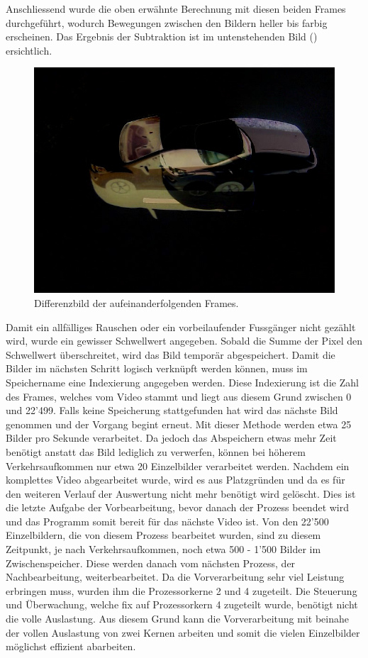 Anschliessend wurde die oben erwähnte Berechnung mit diesen beiden Frames durchgeführt, wodurch Bewegungen zwischen den Bildern heller bis farbig erscheinen. Das Ergebnis der Subtraktion ist im untenstehenden Bild () ersichtlich.

\begin{figure}[H]
  \centering
  \includegraphics[height=0.3\textheight]{Software/Blur1.jpg} 
  \caption{Differenzbild der aufeinanderfolgenden Frames.}
  \label{bBlur1}
\end{figure} 

Damit ein allfälliges Rauschen oder ein vorbeilaufender Fussgänger nicht gezählt wird, wurde ein gewisser Schwellwert angegeben. Sobald die Summe der Pixel den Schwellwert überschreitet, wird das Bild temporär abgespeichert. Damit die Bilder im nächsten Schritt logisch verknüpft werden können, muss im Speichername eine Indexierung angegeben werden. Diese Indexierung ist die Zahl des Frames, welches vom Video stammt und liegt aus diesem Grund zwischen 0 und 22'499. Falls keine Speicherung stattgefunden hat wird das nächste Bild genommen und der Vorgang begint erneut. Mit dieser Methode werden etwa 25 Bilder pro Sekunde verarbeitet. Da jedoch das Abspeichern etwas mehr Zeit benötigt anstatt das Bild lediglich zu verwerfen, können bei höherem Verkehrsaufkommen nur etwa 20 Einzelbilder verarbeitet werden. Nachdem ein komplettes Video abgearbeitet wurde, wird es aus Platzgründen und da es für den weiteren Verlauf der Auswertung nicht mehr benötigt wird gelöscht. Dies ist die letzte Aufgabe der Vorbearbeitung, bevor danach der Prozess beendet wird und das Programm somit bereit für das nächste Video ist. Von den 22'500 Einzelbildern, die von diesem Prozess bearbeitet wurden, sind zu diesem Zeitpunkt, je nach Verkehrsaufkommen, noch etwa 500 - 1'500 Bilder im Zwischenspeicher. Diese werden danach vom nächsten Prozess, der Nachbearbeitung, weiterbearbeitet. Da die Vorverarbeitung sehr viel Leistung erbringen muss, wurden ihm die Prozessorkerne 2 und 4 zugeteilt. Die Steuerung und Überwachung, welche fix auf Prozessorkern 4 zugeteilt wurde, benötigt nicht die volle Auslastung. Aus diesem Grund kann die Vorverarbeitung mit beinahe der vollen Auslastung von zwei Kernen arbeiten und somit die vielen Einzelbilder möglichst effizient abarbeiten.

